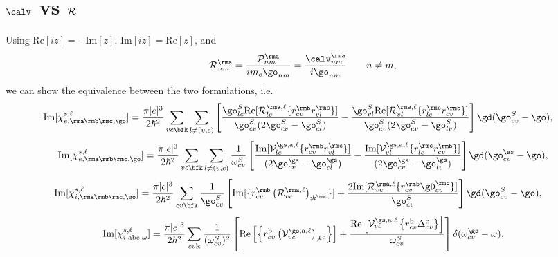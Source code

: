 \section{$\calv$ vs ${\cal R}$}

Using 
$\mathrm{Re}[iz]=-\mathrm{Im}[z]$,
$\mathrm{Im}[iz]=\mathrm{Re}[z]$,
and
\begin{equation}\label{rnmenm91}
{\cal R}^\rma_{nm}=\frac{{\cal P}^\rma_{nm}}{im_e\go_{nm}}=\frac{\calv^\rma_{nm}}{i\go_{nm}}
\quad\quad n\ne m
,
\end{equation}
we can show the equivalence between the two formulations, i.e.
\begin{align}\label{imchiew}
\mathrm{Im}[\chi_{e,\rma\rmb\rmc,\go}^{s,\ell}]
&=
\frac{\pi |e|^3}{2\hbar^2} 
\sum_{vc\bfk}
\sum_{l\neq(v,c)}
\left[
\frac{\go^S_{lc}\mathrm{Re}[{\cal R}^{\rma,\ell}_{lc}\{r^{\rmb}_{cv}r^{\rmc}_{vl}\}]}
{\go^S_{cv}(2\go^S_{cv}-\go^S_{cl})}
-
\frac{\go^S_{vl}\mathrm{Re}[{\cal R}^{\rma,\ell}_{vl}\{r^{\rmc}_{lc}r^{\rmb}_{cv}\}]}
{\go^S_{cv}(2\go^S_{cv}-\go^S_{lv})}
\right]
\gd(\go^S_{cv}-\go)
,
\end{align}  
\begin{equation}\label{c-calvimchiewn}
\mathrm{Im}[\chi_{e,\rma\rmb\rmc,\go}^{s,\ell}] =
\frac{\pi |e|^3}{2\hbar^2}\sum_{vc\bfk}\sum_{l\neq(v,c)}\frac{1}{\omega^{S}_{cv}}
\left[
\frac{\mathrm{Im}[\mathcal{V}^{\gs,\text{a},\ell}_{lc}\{r^{\rmb}_{cv}r^{\rmc}_{vl}\}]}
{(2\go^\gs_{cv}-\go^\gs_{cl})} 
-\frac{\mathrm{Im}[\mathcal{V}^{\gs,\text{a},\ell}_{vl}\{r^{\rmc}_{lc}r^{\rmb}_{cv}\}]}
{(2\go^\gs_{cv}-\go^\gs_{lv})}
\right]\gd(\go^\gs_{cv}-\go),
\end{equation}  
\begin{align}\label{imchiwf}
\mathrm{Im}[\chi_{i,\rma\rmb\rmc,\go}^{s,\ell}]
&=
\frac{\pi|e|^3}{2\hbar^2}
\sum_{cv\bfk}
\frac{1}{\go^S_{cv}}
\left[
\mathrm{Im}[\{r^{\rmb}_{cv}\left({\cal R}^{\rma,\ell}_{vc}\right)_{;k^{\rmc}}\}]
+
\frac{2\mathrm{Im}[{\cal R}^{\rma,\ell}_{vc}\{r^{\rmb}_{cv}\gD^{\rmc}_{cv}\}]}{\go^S_{cv}}
\right]
\gd(\go^S_{cv}-\go)
,
\end{align}
\begin{equation}\label{c-calvimchiwn}
\mathrm{Im}[\chi_{i,\text{a}\text{b}\text{c},\omega}^{s,\ell}]
= \frac{\pi\vert e\vert^3}{2\hbar^2}\sum_{cv\mathbf{k}}\frac{1}{(\omega^{S}_{cv})^{2}}
\left[
\mathrm{Re}\left[\left\{r^{\text{b}}_{cv}\left(\mathcal{V}^{\gs,\text{a},\ell}_{vc}\right)_{;k^{\text{c}}}\right\}\right]
+\frac{\mathrm{Re}\left[\mathcal{V}^{\gs,\text{a},\ell}_{vc}\left\{r^{\text{b}}_{cv}
\Delta^{\text{c}}_{cv}\right\}\right]}{\omega^{S}_{cv}} 
\right]\delta(\omega^\gs_{cv}-\omega),
\end{equation}
